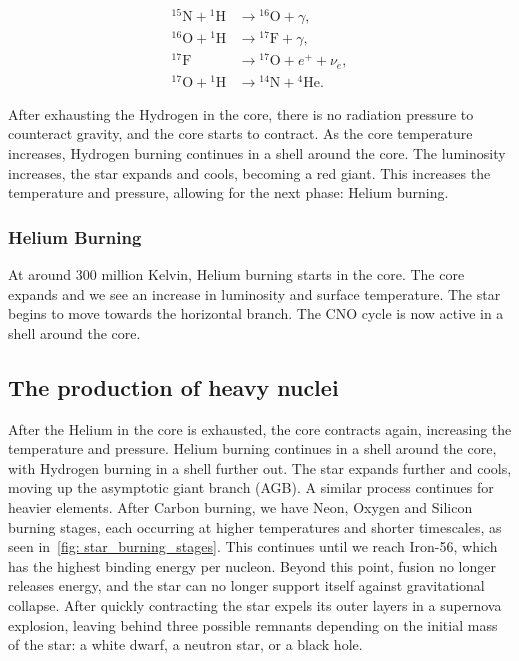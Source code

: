 \documentclass[english, notitlepage]{article}
\begin{document}
\begin{align}
    {}^{15}\text{N} + {}^{1}\text{H} &→ {}^{16}\text{O} + γ,\label{CNO_7} \\
    {}^{16}\text{O} + {}^{1}\text{H} &→ {}^{17}\text{F} + γ,\label{CNO_8} \\
    {}^{17}\text{F} &→ {}^{17}\text{O} + e{}^{+} + \nu_{e},\label{CNO_9} \\
    {}^{17}\text{O} + {}^{1}\text{H} &→ {}^{14}\text{N} + {}^{4}\text{He}. \label{CNO_10}
\end{align}

After exhausting the Hydrogen in the core, there is no radiation pressure to counteract gravity, and the core starts to contract. As the core temperature increases, Hydrogen burning continues in a shell around the core. The luminosity increases, the star expands and cools, becoming a red giant. This increases the temperature and pressure, allowing for the next phase: Helium burning. 

\subsubsection{Helium Burning}
At around 300 million Kelvin, Helium burning starts in the core. The core expands and we see an increase in luminosity and surface temperature. The star begins to move towards the horizontal branch. The CNO cycle is now active in a shell around the core. 

\subsection{The production of heavy nuclei}
After the Helium in the core is exhausted, the core contracts again, increasing the temperature and pressure. Helium burning continues in a shell around the core, with Hydrogen burning in a shell further out. The star expands further and cools, moving up the asymptotic giant branch (AGB). A similar process continues for heavier elements. After Carbon burning, we have Neon, Oxygen and Silicon burning stages, each occurring at higher temperatures and shorter timescales, as seen in~\cref{fig: star_burning_stages}. This continues until we reach Iron-56, which has the highest binding energy per nucleon. Beyond this point, fusion no longer releases energy, and the star can no longer support itself against gravitational collapse. After quickly contracting the star expels its outer layers in a supernova explosion, leaving behind three possible remnants depending on the initial mass of the star: a white dwarf, a neutron star, or a black hole. 
\end{document}
